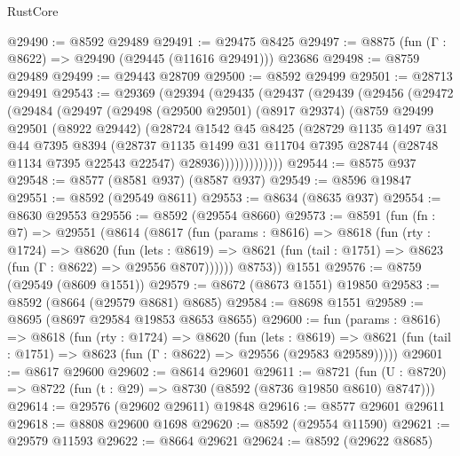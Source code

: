 \begin{lexlean}{RustCore}
\begin{coremodule}
@29490 := @8592 @29489
@29491 := @29475 @8425
@29497 := @8875 (fun (Γ : @8622) => @29490 (@29445 (@11616 @29491))) @23686
@29498 := @8759 @29489
@29499 := @29443 @28709
@29500 := @8592 @29499
@29501 := @28713 @29491
@29543 := @29369
    (@29394
      (@29435
        (@29437
          (@29439
            (@29456
              (@29472
                (@29484
                  (@29497
                    (@29498
                      (@29500 @29501)
                      (@8917 @29374)
                      (@8759
                        @29499
                        @29501
                        (@8922 @29442)
                        (@28724
                          @1542
                          @45
                          @8425
                          (@28729
                            @1135
                            @1497
                            @31
                            @44
                            @7395
                            @8394
                            (@28737
                              @1135
                              @1499
                              @31
                              @11704
                              @7395
                              @28744
                              (@28748 @1134 @7395 @22543 @22547)
                              @28936)))))))))))))
@29544 := @8575 @937
@29548 := @8577 (@8581 @937) (@8587 @937)
@29549 := @8596 @19847
@29551 := @8592 (@29549 @8611)
@29553 := @8634 (@8635 @937)
@29554 := @8630 @29553
@29556 := @8592 (@29554 @8660)
@29573 := @8591
    (fun (fn : @7) =>
    @29551
      (@8614
        (@8617
          (fun (params : @8616) =>
          @8618
            (fun (rty : @1724) =>
            @8620
              (fun (lets : @8619) =>
              @8621 (fun (tail : @1751) => @8623 (fun (Γ : @8622) => @29556 @8707))))))
        @8753))
    @1551
@29576 := @8759 (@29549 (@8609 @1551))
@29579 := @8672 (@8673 @1551) @19850
@29583 := @8592 (@8664 (@29579 @8681) @8685)
@29584 := @8698 @1551
@29589 := @8695 (@8697 @29584 @19853 @8653 @8655)
@29600 := fun (params : @8616) =>
  @8618
    (fun (rty : @1724) =>
    @8620
      (fun (lets : @8619) =>
      @8621 (fun (tail : @1751) => @8623 (fun (Γ : @8622) => @29556 (@29583 @29589)))))
@29601 := @8617 @29600
@29602 := @8614 @29601
@29611 := @8721
    (fun (U : @8720) => @8722 (fun (t : @29) => @8730 (@8592 (@8736 @19850 @8610) @8747)))
@29614 := @29576 (@29602 @29611) @19848
@29616 := @8577 @29601 @29611
@29618 := @8808 @29600 @1698
@29620 := @8592 (@29554 @11590)
@29621 := @29579 @11593
@29622 := @8664 @29621
@29624 := @8592 (@29622 @8685)

\end{coremodule}
\end{lexlean}
